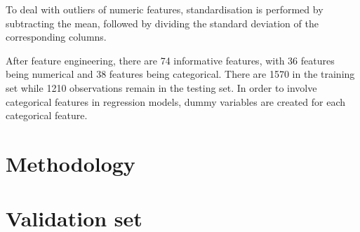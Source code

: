 \documentclass[letterpaper,12pt,twoside,]{pinp}
\begin{document}
To deal with outliers of numeric features, standardisation is performed
by subtracting the mean, followed by dividing the standard deviation of
the corresponding columns.

After feature engineering, there are 74 informative features, with 36
features being numerical and 38 features being categorical. There are
1570 in the training set while 1210 observations remain in the testing
set. In order to involve categorical features in regression models,
dummy variables are created for each categorical feature.

\hypertarget{methodology}{%
\section{Methodology}\label{methodology}}

\hypertarget{validation-set}{%
\section{Validation set}\label{validation-set}}



\renewcommand\refname{Conclusion}


\end{document}
